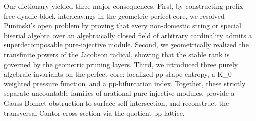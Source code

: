 \documentclass[11pt,a4paper,reqno]{amsart}
\def\({}%
\def\){}%
\theoremstyle{definition}
\theoremstyle{remark}
\begin{document}
Our dictionary yielded three major consequences. First, by constructing prefix-free dyadic block interleavings in the geometric perfect core, we resolved Puninski's open problem by proving that every non-domestic string or special biserial algebra over an algebraically closed field of arbitrary cardinality admits a superdecomposable pure-injective module. Second, we geometrically realized the transfinite powers of the Jacobson radical, showing that the stable rank is governed by the geometric pruning layers. Third, we introduced three purely algebraic invariants on the perfect core: localized pp-shape entropy, a \(K_0\)-weighted pressure function, and a pp-bifurcation index. Together, these strictly separate uncountable families of arational pure-injective modules, provide a Gauss-Bonnet obstruction to surface self-intersection, and reconstruct the transversal Cantor cross-section via the quotient pp-lattice.
\end{document}
